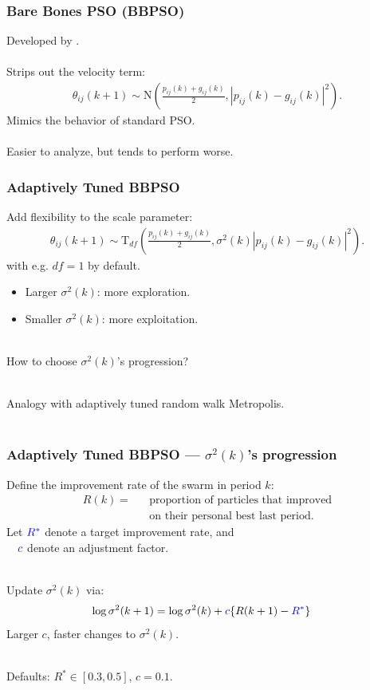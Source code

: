 \documentclass[xcolor=dvipsnames]{beamer}
\begin{document}
\begin{frame}
\frametitle{Bare Bones PSO (BBPSO)}
Developed by \citet{kennedy2003bare}.\\~\\

Strips out the velocity term:
\begin{align*}
\theta_{ij}(k+1) \sim \mathrm{N}\left(\frac{p_{ij}(k) + g_{ij}(k)}{2}, |p_{ij}(k) - g_{ij}(k)|^2\right).
\end{align*}
Mimics the behavior of standard PSO.\\~\\

Easier to analyze, but tends to perform worse.
\end{frame}

\begin{frame}
\frametitle{Adaptively Tuned BBPSO}
Add flexibility to the scale parameter:
\begin{align*}
\theta_{ij}(k+1) \sim \mathrm{T}_{df}\left(\frac{p_{ij}(k) + g_{ij}(k)}{2}, \sigma^2(k)|p_{ij}(k) - g_{ij}(k)|^2\right).
\end{align*}
with e.g. $df = 1$ by default.
\begin{itemize}
\item Larger $\sigma^2(k)$: more exploration.
\item Smaller $\sigma^2(k)$: more exploitation.\\~\\
\end{itemize}
How to choose $\sigma^2(k)$'s progression? \\~\\

\pause 

Analogy with adaptively tuned random walk Metropolis.\\
\ \  \citep{andrieu2008tutorial}
\end{frame}

\begin{frame}
\frametitle{Adaptively Tuned BBPSO --- $\sigma^2(k)$'s progression}
Define the improvement rate of the swarm in period $k$:
\begin{align*}
R(k) = &&  \mbox{proportion of particles that improved}\\
       &&  \mbox{on their personal best last period.}
\end{align*}
\pause
Let ${\color{blue}R^*}$ denote a target improvement rate, and\\
\ \ ${\color{blue}c}$ denote an adjustment factor.\\~

Update $\sigma^2(k)$ via:
\begin{align*}
\log \sigma^2(k+1) &= \log\sigma^2(k) + {\color{blue}c}\{R(k+1) - {\color{blue}R^*}\}
\end{align*}
\pause
Larger $c$, faster changes to $\sigma^2(k)$.\\~

\pause

Defaults: $R^*\in[0.3, 0.5]$, $c = 0.1$.
\end{frame}
\end{document}
